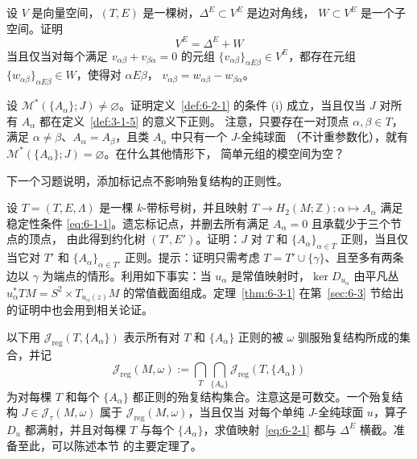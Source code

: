 \begin{exercise}\label{ex:6-2-3}
设 $V$ 是向量空间，$(T,E)$ 是一棵树，$\Delta^E\subset V^E$ 是边对角线，
$W\subset V^E$ 是一个子空间。证明
\[
  V^E=\Delta^E+W
\]
当且仅当对每个满足 $v_{\alpha\beta}+v_{\beta\alpha}=0$ 的元组
$\{v_{\alpha\beta}\}_{\alpha E\beta}\in V^E$，都存在元组
$\{w_{\alpha\beta}\}_{\alpha E\beta}\in W$，使得对 $\alpha E\beta$，
$v_{\alpha\beta}=w_{\alpha\beta}-w_{\beta\alpha}$。
\end{exercise}

\begin{exercise}\label{ex:6-2-4}
设 $\mathcal M^*(\{A_\alpha\};J)\ne\varnothing$。证明定义~\ref{def:6-2-1} 的条件
(i) 成立，当且仅当 $J$ 对所有 $A_\alpha$ 都在定义~\ref{def:3-1-5} 的意义下正则。
注意，只要存在一对顶点 $\alpha,\beta\in T$，满足
$\alpha\ne\beta$、$A_\alpha=A_\beta$，且类 $A_\alpha$ 中只有一个 $J$-全纯球面
（不计重参数化），就有 $\mathcal M^*(\{A_\alpha\};J)=\varnothing$。在什么其他情形下，
简单元组的模空间为空？
\end{exercise}

下一个习题说明，添加标记点不影响殆复结构的正则性。

\begin{exercise}\label{ex:6-2-5}
设 $T=(T,E,\Lambda)$ 是一棵 $k$-带标号树，并且映射
$T\to H_2(M;\mathbb Z):\alpha\mapsto A_\alpha$ 满足稳定性条件
\eqref{eq:6-1-1}。遗忘标记点，并删去所有满足 $A_\alpha=0$ 且承载少于三个节点的顶点，
由此得到约化树 $(T',E')$。证明：$J$ 对 $T$ 和
$\{A_\alpha\}_{\alpha\in T}$ 正则，当且仅当它对 $T'$ 和
$\{A_\alpha\}_{\alpha\in T'}$ 正则。提示：证明只需考虑
$T=T'\cup\{\gamma\}$、且至多有两条边以 $\gamma$ 为端点的情形。利用如下事实：当
$u_\alpha$ 是常值映射时，$\ker D_{u_\alpha}$ 由平凡丛
$u_\alpha^*TM=S^2\times T_{u_\alpha(z)}M$ 的常值截面组成。定理~\ref{thm:6-3-1}
在第~\ref{sec:6-3} 节给出的证明中也会用到相关论证。
\end{exercise}

以下用 $\mathcal J_{\mathrm{reg}}(T,\{A_\alpha\})$ 表示所有对
$T$ 和 $\{A_\alpha\}$ 正则的被 $\omega$ 驯服殆复结构所成的集合，并记
\[
  \mathcal J_{\mathrm{reg}}(M,\omega)
  :=\bigcap_T\bigcap_{\{A_\alpha\}}
  \mathcal J_{\mathrm{reg}}(T,\{A_\alpha\})
\]
为对每棵 $T$ 和每个 $\{A_\alpha\}$ 都正则的殆复结构集合。注意这是可数交。一个殆复结构
$J\in\mathcal J_\tau(M,\omega)$ 属于 $\mathcal J_{\mathrm{reg}}(M,\omega)$，当且仅当
对每个单纯 $J$-全纯球面 $u$，算子 $D_u$ 都满射，并且对每棵 $T$ 与每个
$\{A_\alpha\}$，求值映射~\eqref{eq:6-2-1} 都与 $\Delta^E$ 横截。准备至此，可以陈述本节
的主要定理了。

